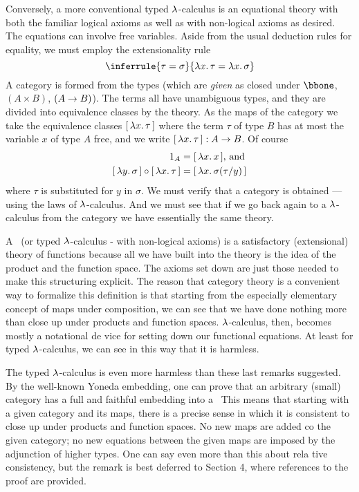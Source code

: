 Conversely, a more conventional typed $\lambda$-calculus is an equational theory with both the familiar logical axioms as well as with non-logical axioms as desired. The equations can involve free variables. Aside from the usual deduction rules for equality, we must employ the extensionality rule
$$
\inferrule
  {\tau = \sigma}
  {\l x .\, \tau = \l x .\, \sigma}
$$
%
A category is formed from the types (which are {\it given} as closed under $\bbone$, $(A \times B)$, $(A \rightarrow B)$). The terms all have unambiguous
types, and they are divided into equivalence classes by the theory. As the maps of the category we take the equivalence classes $\br{\lm{x}.\tau}$ where the term $\tau$ of type $B$ has at most the variable $x$ of type $A$ free, and we write $\br{\lm{x}.\tau} : \AB$. Of course
\begin{align*}
\id_A &= \br{\lm{x}.x}, \, \textrm{and}\\
\br{\lm{y}.\sigma} \comp \br{\lm{x}.\tau} &= \br{\lm{x}.\sigma(\tau/y)}
\end{align*}
where $\tau$ is substituted for $y$ in $\sigma$. We must verify that a category is obtained --- using the laws of $\lambda$-calculus.  And we must
see that if we go back again to a $\lambda$-calculus from the category we have essentially the same theory.

A \ccc\ (or typed $\lambda$-calculus - with non-logical axioms) is a satisfactory (extensional) theory of functions because all we have built into the theory is the idea of the product and the function space. The axioms set down are just those needed to make this structuring explicit.
The reason that category theory is a convenient way to formalize this definition is that starting from the especially elementary concept of maps under composition, we can see that we have done nothing more than close up under products and function spaces. $\lambda$-calculus, then, becomes mostly a notational de vice for setting down our functional equations. At least for typed $\lambda$-calculus, we can see in this way that it is harmless.

The typed $\lambda$-calculus is even more harmless than these last remarks suggested. By the well-known Yoneda embedding, one can prove that an arbitrary (small) category has a full and faithful embedding into a \ccc\ This means that starting with a given category and its maps, there is a precise sense in which it is consistent to close up under products and function spaces. No new maps are added co the given category; no new equations between the given maps are imposed by the adjunction of higher types. One can say even more than this about rela tive consistency, but the remark is best deferred to Section 4, where references to the proof are provided.

